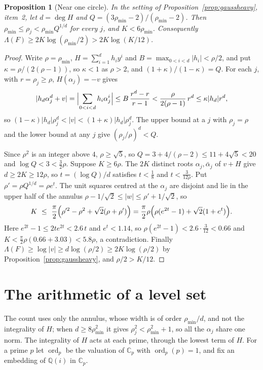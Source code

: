 \documentclass[11pt]{article}
\newtheorem{proposition}[theorem]{Proposition}
\begin{document}
\begin{proposition}[Near one circle]\label{prop:gausscircle}
In the setting of Proposition~\ref{prop:gaussheavy}, item~2, let
$d=\deg H$ and $Q=(3\rho_{\min}-2)/(\rho_{\min}-2)$.  Then
$\rho_{\min}\le\rho_j<\rho_{\min}Q^{1/d}$ for every $j$, and
$K<6\rho_{\min}$.  Consequently
$\Lambda(F)\ge2K\log(\rho_{\min}/2)>2K\log(K/12)$.
\end{proposition}

\begin{proof}
Write $\rho=\rho_{\min}$, $H=\sum_{i=1}^dh_iy^i$ and
$B=\max_{0<i<d}|h_i|<\rho/2$, and put $\kappa=\rho/(2(\rho-1))$, so
$\kappa<1$ as $\rho>2$, and $(1+\kappa)/(1-\kappa)=Q$.  For each $j$, with
$r=\rho_j\ge\rho$, $H(\alpha_j)=-v$ gives
\[
  |h_d\alpha_j^d+v|=\Bigl|\sum_{0<i<d}h_i\alpha_j^i\Bigr|
  \le B\,\frac{r^d-r}{r-1}<\frac{\rho}{2(\rho-1)}\,r^d\le\kappa|h_d|r^d,
\]
so $(1-\kappa)|h_d|\rho_j^d<|v|<(1+\kappa)|h_d|\rho_j^d$.  The upper bound at a
$j$ with $\rho_j=\rho$ and the lower bound at any $j$ give
$(\rho_j/\rho)^d<Q$.

Since $\rho^2$ is an integer above $4$, $\rho\ge\sqrt5$, so
$Q=3+4/(\rho-2)\le11+4\sqrt5<20$ and $\log Q<3<\frac32\rho$.  Suppose
$K\ge6\rho$.  The $2K$ distinct roots $\alpha_j,\bar\alpha_j$ of $v+H$ give
$d\ge2K\ge12\rho$, so $t=(\log Q)/d$ satisfies $t<\frac18$ and
$t<\frac3{12\rho}$.  Put $\rho'=\rho Q^{1/d}=\rho e^t$.  The unit squares
centred at the $\alpha_j$ are disjoint and lie in the upper half of the
annulus $\rho-1/\sqrt2\le|w|\le\rho'+1/\sqrt2$, so
\[
  K\ \le\ \frac\pi2\Bigl(\rho'^2-\rho^2+\sqrt2(\rho+\rho')\Bigr)
  =\frac\pi2\rho\Bigl(\rho(e^{2t}-1)+\sqrt2(1+e^t)\Bigr).
\]
Here $e^{2t}-1\le2te^{2t}<2.6\,t$ and $e^t<1.14$, so
$\rho(e^{2t}-1)<2.6\cdot\frac3{12}<0.66$ and
$K<\frac\pi2\rho(0.66+3.03)<5.8\rho$, a contradiction.  Finally
$\Lambda(F)\ge\log|v|\ge d\log(\rho/2)\ge2K\log(\rho/2)$ by
Proposition~\ref{prop:gaussheavy}, and $\rho/2>K/12$.
\end{proof}

\section{The arithmetic of a level set}\label{sec:levelprimes}

The count uses only the annulus, whose width is of order $\rho_{\min}/d$,
and not the integrality of $H$; when $d\ge8\rho_{\min}^2$ it gives
$\rho_j^2<\rho_{\min}^2+1$, so all the $\alpha_j$ share one norm.  The
integrality of $H$ acts at each prime, through the lowest term of $H$.  For
a prime $p$ let $\operatorname{ord}_p$ be the valuation of $\mathbb C_p$ with
$\operatorname{ord}_p(p)=1$, and fix an embedding of $\mathbb Q(i)$ in
$\mathbb C_p$.
\end{document}

